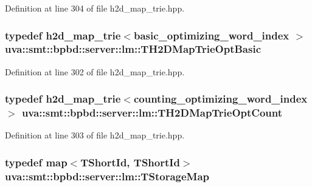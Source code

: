 Definition at line 304 of file h2d\+\_\+map\+\_\+trie.\+hpp.

\hypertarget{namespaceuva_1_1smt_1_1bpbd_1_1server_1_1lm_a7b17b8a558ebd81c8e153c3767d65b4a}{}
\subsubsection[{T\+H2\+D\+Map\+Trie\+Opt\+Basic}]{\setlength{\rightskip}{0pt plus 5cm}typedef {\bf h2d\+\_\+map\+\_\+trie}$<${\bf basic\+\_\+optimizing\+\_\+word\+\_\+index} $>$ {\bf uva\+::smt\+::bpbd\+::server\+::lm\+::\+T\+H2\+D\+Map\+Trie\+Opt\+Basic}}\label{namespaceuva_1_1smt_1_1bpbd_1_1server_1_1lm_a7b17b8a558ebd81c8e153c3767d65b4a}


Definition at line 302 of file h2d\+\_\+map\+\_\+trie.\+hpp.

\hypertarget{namespaceuva_1_1smt_1_1bpbd_1_1server_1_1lm_a1ff5e5e7b88a2dbde50873a38d1700ce}{}
\subsubsection[{T\+H2\+D\+Map\+Trie\+Opt\+Count}]{\setlength{\rightskip}{0pt plus 5cm}typedef {\bf h2d\+\_\+map\+\_\+trie}$<${\bf counting\+\_\+optimizing\+\_\+word\+\_\+index} $>$ {\bf uva\+::smt\+::bpbd\+::server\+::lm\+::\+T\+H2\+D\+Map\+Trie\+Opt\+Count}}\label{namespaceuva_1_1smt_1_1bpbd_1_1server_1_1lm_a1ff5e5e7b88a2dbde50873a38d1700ce}


Definition at line 303 of file h2d\+\_\+map\+\_\+trie.\+hpp.

\hypertarget{namespaceuva_1_1smt_1_1bpbd_1_1server_1_1lm_a848930f30620014225832ed8d3e6a93e}{}
\subsubsection[{T\+Storage\+Map}]{\setlength{\rightskip}{0pt plus 5cm}typedef map$<${\bf T\+Short\+Id}, {\bf T\+Short\+Id}$>$ {\bf uva\+::smt\+::bpbd\+::server\+::lm\+::\+T\+Storage\+Map}}\label{namespaceuva_1_1smt_1_1bpbd_1_1server_1_1lm_a848930f30620014225832ed8d3e6a93e}


